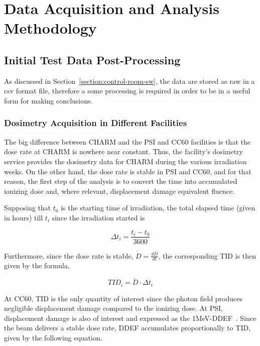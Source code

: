 \section{Data Acquisition and Analysis Methodology}
\label{sec:data-acquisition-methodology}

\subsection{Initial Test Data Post-Processing}
\label{subsection:data-post-processing}

As discussed in Section~\ref{section:control-room-sw}, the data are stored as raw in a csv format file, therefore a some processing is required in order to be in a useful form for making conclusions.

\subsubsection*{Dosimetry Acquisition in Different Facilities}

The big difference between CHARM and the PSI and CC60 facilities is that the dose rate at CHARM is nowhere near constant. Thus, the facility's dosimetry service provides the dosimetry data for CHARM during the various irradiation weeks. On the other hand, the dose rate is stable in PSI and CC60, and for that reason, the first step of the analysis is to convert the time into accumulated ionizing dose and, where relevant, displacement damage equivalent fluence.

Supposing that $t_0$ is the starting time of irradiation, the total elapsed time (given in hours) till $t_i$ since the irradiation started is

\begin{equation*}
    \Delta t_i = \frac{t_i-t_0}{3600}
\end{equation*}

Furthermore, since the dose rate is stable, $\dot{D} = \frac{dD}{dt}$, the corresponding TID is then given by the formula,

\begin{equation*}
    TID_i = \dot{D} \cdot \Delta t_i
\end{equation*}

At CC60, TID is the only quantity of interest since the photon field produces negligible displacement damage compared to the ionizing dose. At PSI, displacement damage is also of interest and expressed as the 1MeV-DDEF~\cite{ferraro_phd_thesis}. Since the beam delivers a stable dose rate, DDEF accumulates proportionally to TID, given by the following equation.


